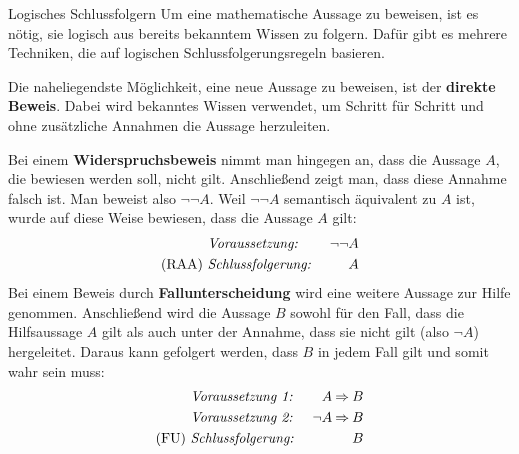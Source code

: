 \documentclass[../../main.tex]{subfiles}
\begin{document}
\begin{nutshell}{Logisches Schlussfolgern}
    Um eine mathematische Aussage zu beweisen, ist es nötig, sie logisch aus bereits bekanntem Wissen zu folgern. Dafür gibt es mehrere Techniken, die auf logischen Schlussfolgerungsregeln basieren.

    Die naheliegendste Möglichkeit, eine neue Aussage zu beweisen, ist der \textbf{direkte Beweis}. Dabei wird bekanntes Wissen verwendet, um Schritt für Schritt und ohne zusätzliche Annahmen die Aussage herzuleiten.

    Bei einem \textbf{Widerspruchsbeweis} nimmt man hingegen an, dass die Aussage $A$, die bewiesen werden soll, nicht gilt. Anschließend zeigt man, dass diese Annahme falsch ist. Man beweist also $\lnot\lnot A$. Weil $\lnot\lnot A$ semantisch äquivalent zu $A$ ist, wurde auf diese Weise bewiesen, dass die Aussage $A$ gilt:
    \begin{align*}
        &\text{\emph{Voraussetzung:}}~&\lnot\lnot A\\
        \text{(RAA)}~&\text{\emph{Schlussfolgerung:}}~&A
    \end{align*}
    Bei einem Beweis durch \textbf{Fallunterscheidung} wird eine weitere Aussage zur Hilfe genommen. Anschließend wird die Aussage $B$ sowohl für den Fall, dass die Hilfsaussage $A$ gilt als auch unter der Annahme, dass sie nicht gilt (also $\lnot A$) hergeleitet. Daraus kann gefolgert werden, dass $B$ in jedem Fall gilt und somit wahr sein muss:
    \begin{align*}
        &\text{\emph{Voraussetzung~1:}}~&A \mathbin{\Rightarrow} B\\
        &\text{\emph{Voraussetzung~2:}}~&\lnot A \mathbin{\Rightarrow} B\\
        \text{(FU)}~&\text{\emph{Schlussfolgerung:}}~&B
    \end{align*}
\end{nutshell}
\end{document}

